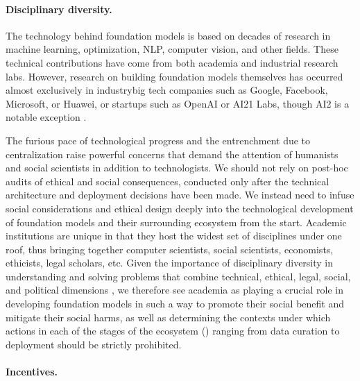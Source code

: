 \paragraph{Disciplinary diversity.}

The technology behind foundation models is based on decades of research in
machine learning, optimization, NLP, computer vision, and other fields.
These technical contributions have come from both academia and industrial research labs.
However, research on building foundation models themselves has occurred almost exclusively in industry\dash{}big tech
companies such as Google, Facebook, Microsoft, or Huawei, or startups such as
OpenAI or AI21 Labs, though AI2 is a notable exception \citep{peters2018elmo,zellers2019neuralfakenews}.

The furious pace of technological progress and the entrenchment due to centralization
raise powerful concerns that demand the attention of humanists and social scientists in addition to technologists.
We should not rely on post-hoc audits of ethical and social consequences,
conducted only after the technical architecture and deployment decisions have been made.
We instead need to infuse social considerations and ethical design
deeply into the technological development of foundation models and
their surrounding ecosystem from the start.
Academic institutions are unique in that they host the widest set of disciplines under one roof,
thus bringing together computer scientists, social scientists, economists, ethicists, legal scholars, etc.
Given the importance of disciplinary diversity in understanding and solving problems that combine technical, ethical, legal, social, and political dimensions \citep{hong2004groups,solomon2006norms,steel2018multiple},
we therefore see academia as playing a crucial role
in developing foundation models in such a way to promote their social benefit and mitigate their social harms,
as well as determining the contexts under which actions in each of the stages of the ecosystem () ranging from data curation to deployment should be strictly prohibited.

\paragraph{Incentives.}

